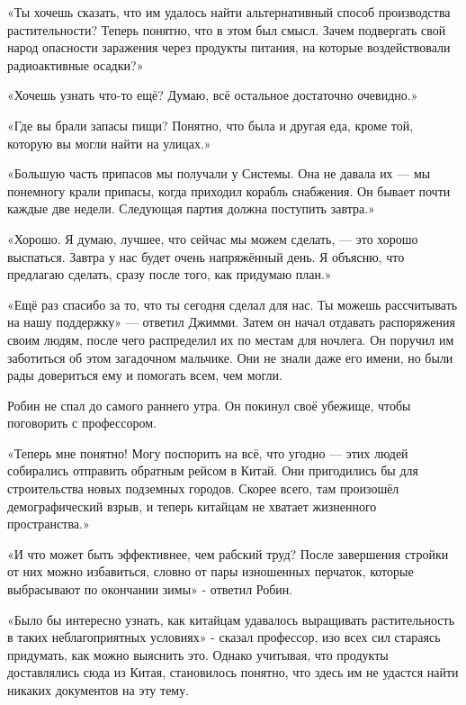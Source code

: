 \documentclass[a4paper,12pt]{book}
\begin{document}
\par
«Ты хочешь сказать, что им удалось найти альтернативный способ производства растительности? Теперь понятно, что в этом был смысл. Зачем подвергать свой народ опасности заражения через продукты питания, на которые воздействовали радиоактивные осадки?»
\par
«Хочешь узнать что-то ещё? Думаю, всё остальное достаточно очевидно.»
\par
«Где вы брали запасы пищи? Понятно, что была и другая еда, кроме той, которую вы могли найти на улицах.»
\par
«Большую часть припасов мы получали у Системы. Она не давала их — мы понемногу крали припасы, когда приходил корабль снабжения. Он бывает почти каждые две недели. Следующая партия должна поступить завтра.»
\par
«Хорошо. Я думаю, лучшее, что сейчас мы можем сделать, — это хорошо выспаться. Завтра у нас будет очень напряжённый день. Я объясню, что предлагаю сделать, сразу после того, как придумаю план.»
\par
«Ещё раз спасибо за то, что ты сегодня сделал для нас. Ты можешь рассчитывать на нашу поддержку» — ответил Джимми. Затем он начал отдавать распоряжения своим людям, после чего распределил их по местам для ночлега. Он поручил им заботиться об этом загадочном мальчике. Они не знали даже его имени, но были рады довериться ему и помогать всем, чем могли.\\
\par
Робин не спал до самого раннего утра. Он покинул своё убежище, чтобы поговорить с профессором.
\par
«Теперь мне понятно! Могу поспорить на всё, что угодно — этих людей собирались отправить обратным рейсом в Китай. Они пригодились бы для строительства новых подземных городов. Скорее всего, там произошёл демографический взрыв, и теперь китайцам не хватает жизненного пространства.»
\par
«И что может быть эффективнее, чем рабский труд? После завершения стройки от них можно избавиться, словно от пары изношенных перчаток, которые выбрасывают по окончании зимы» - ответил Робин.
\par
«Было бы интересно узнать, как китайцам удавалось выращивать растительность в таких неблагоприятных условиях» - сказал профессор, изо всех сил стараясь придумать, как можно выяснить это. Однако учитывая, что продукты доставлялись сюда из Китая, становилось понятно, что здесь им не удастся найти никаких документов на эту тему.
\par
\end{document}
